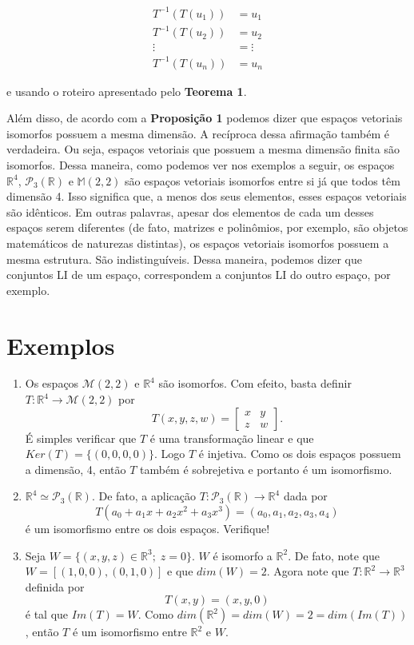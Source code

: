 \begin{align*}
T^{-1}(T(u_1))&= u_1\\
T^{-1}(T(u_2))&= u_2\\
               \vdots &=\vdots\\
T^{-1}(T(u_n))&= u_n
\end{align*}

e usando o roteiro apresentado  pelo \textbf{Teorema 1}.

\vspace{1cm}
Além disso, de acordo com a \textbf{Proposição 1} podemos dizer que espaços vetoriais isomorfos  possuem a mesma dimensão. A recíproca dessa afirmação também é verdadeira. Ou seja, espaços vetoriais que possuem a mesma dimensão finita são isomorfos. Dessa maneira, como podemos ver nos exemplos a seguir, os espaços $\mathbb{R}^4$, $\mathcal{P}_3(\mathbb{R})$ e $\mathbb{M}(2,2)$  são espaços vetoriais isomorfos entre si já que todos têm dimensão 4. Isso significa que, a menos dos seus elementos, esses espaços vetoriais são idênticos. Em outras palavras, apesar dos elementos de cada um desses espaços serem diferentes (de fato, matrizes e polinômios, por exemplo, são objetos matemáticos de naturezas distintas), os espaços vetoriais isomorfos possuem a mesma estrutura. São indistinguíveis. Dessa maneira, podemos dizer que conjuntos LI de um espaço, correspondem a conjuntos LI do outro espaço, por exemplo.

\section{Exemplos}
\begin{enumerate}
\item Os espaços $\mathcal{M}(2,2)$ e $\mathbb{R}^4$ são isomorfos.  Com efeito, basta definir $T: \mathbb{R}^4 \rightarrow \mathcal{M}(2,2)$ por $$T(x,y,z,w)= \left[ \begin{array}{cc} x & y\\ z &w\end{array} \right].$$ É simples verificar que $T$ é uma transformação linear e que $Ker(T)=\{(0,0,0,0)\}$. Logo $T$ é injetiva. Como os  dois espaços possuem a dimensão,  4, então $T$ também é sobrejetiva e portanto é um isomorfismo.

\item $\mathbb{R}^4 \simeq \mathcal{P}_3(\mathbb{R})$. De fato, a aplicação $T: \mathcal{P}_3(\mathbb{R}) \rightarrow \mathbb{R}^4$ dada por $$T(a_0+a_1x+a_2x^2+a_3x^3)=(a_0, a_1, a_2, a_3, a_4)$$ é um isomorfismo entre os dois espaços. Verifique!

\item Seja $W=\{(x,y,z)\in \mathbb{R}^3; \; z=0 \}$. $W$ é isomorfo a $\mathbb{R}^2$. De fato, note que $W=[(1,0,0), (0,1,0)]$ e que $dim(W)=2$.  Agora note que $T: \mathbb{R}^2 \rightarrow \mathbb{R}^3$ definida por $$T(x,y)=(x,y,0)$$ é tal que $Im(T)=W$.  Como $dim(\mathbb{R}^2) = dim(W)=2= dim(Im(T))$, então $T$ é um isomorfismo entre $\mathbb{R}^2$ e $W$.
\end{enumerate}

